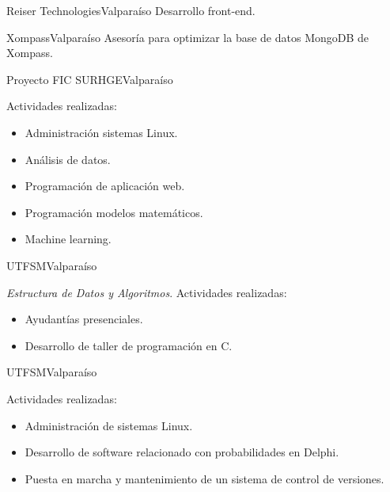 \documentclass[11pt,letterpaper,sans]{moderncv}
\begin{document}
    \pagebreak[0]

      {Reiser Technologies}{Valparaíso}{}
      {
        Desarrollo front-end.
      }

    \pagebreak[0]

      {Xompass}{Valparaíso}{}
      {
        Asesoría para optimizar la base de datos MongoDB de
        Xompass.
      }

    \pagebreak[0]

      {Proyecto FIC SURHGE}{Valparaíso}{}
      {
        Actividades realizadas:
        \begin{itemize}
          \item Administración sistemas Linux.
          \item Análisis de datos.
          \item Programación de aplicación web.
          \item Programación modelos matemáticos.
          \item Machine learning.
        \end{itemize}
      }

    \pagebreak[0]

      {UTFSM}{Valparaíso}{}
      {
        \emph{Estructura de Datos y Algoritmos}.\newline{}
        Actividades realizadas:
        \begin{itemize}
          \item Ayudantías presenciales.
          \item Desarrollo de taller de programación en C.
        \end{itemize}
      }

    \pagebreak[0]

      {UTFSM}{Valparaíso}{}
      {
        Actividades realizadas:
        \begin{itemize}
          \item Administración de sistemas Linux.
          \item Desarrollo de software relacionado con probabilidades en Delphi.
          \item Puesta en marcha y mantenimiento de un sistema de control de versiones.
        \end{itemize}
      }
\end{document}

